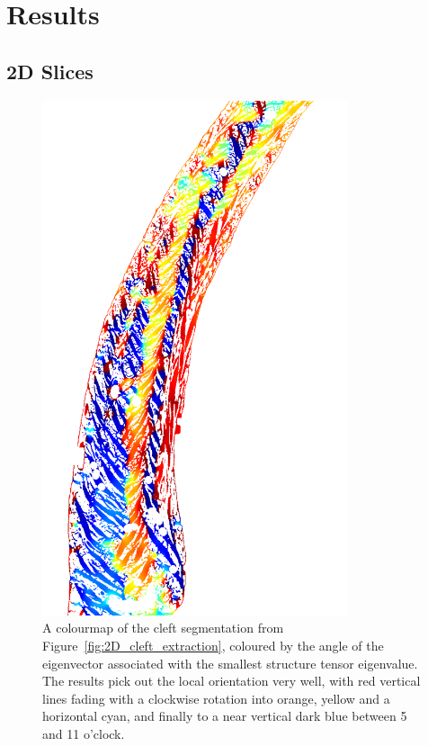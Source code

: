 \section{Results} %
\label{sec:results}
  \subsection{2D Slices} %
  \label{sub:2d_slices}
    
    \begin{figure}[htbp]
      \centering
      \includegraphics[width=0.8\textwidth]{Ch7/Figs/2D/13_angles.png}
      \caption{A colourmap of the cleft segmentation from Figure~\ref{fig:2D_cleft_extraction}, coloured by the angle of the eigenvector associated with the smallest structure tensor eigenvalue. The results pick out the local orientation very well, with red vertical lines fading with a clockwise rotation into orange, yellow and a horizontal cyan, and finally to a near vertical dark blue between 5 and 11 o'clock.}
      \label{fig:2D_angles}
    \end{figure}
    
